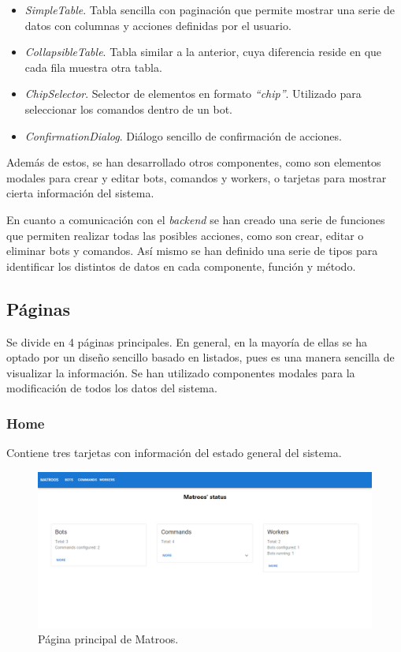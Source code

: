 \begin{itemize}
	\item \textit{SimpleTable}. Tabla sencilla con paginación que permite mostrar una serie de datos con columnas y acciones definidas por el usuario.
	\item \textit{CollapsibleTable}. Tabla similar a la anterior, cuya diferencia reside en que cada fila muestra otra tabla.
	\item \textit{ChipSelector}. Selector de elementos en formato \textit{``chip''}. Utilizado para seleccionar los comandos dentro de un bot.
	\item \textit{ConfirmationDialog}. Diálogo sencillo de confirmación de acciones.
\end{itemize}

Además de estos, se han desarrollado otros componentes, como son elementos modales para crear y editar bots, comandos y workers, o tarjetas para mostrar cierta información del sistema.

En cuanto a comunicación con el \textit{backend} se han creado una serie de funciones que permiten realizar todas las posibles acciones, como son crear, editar o eliminar bots y comandos. Así mismo se han definido una serie de tipos para identificar los distintos de datos en cada componente, función y método.

\subsection{Páginas}

Se divide en 4 páginas principales. En general, en la mayoría de ellas se ha optado por un diseño sencillo basado en listados, pues es una manera sencilla de visualizar la información. Se han utilizado componentes modales para la modificación de todos los datos del sistema.

\subsubsection{Home}

Contiene tres tarjetas con información del estado general del sistema.

\begin{figure}[H]
	\centering
	\includegraphics[width=1\textwidth]{img/front/page-home.png}
	\caption{Página principal de Matroos.}
\end{figure}

